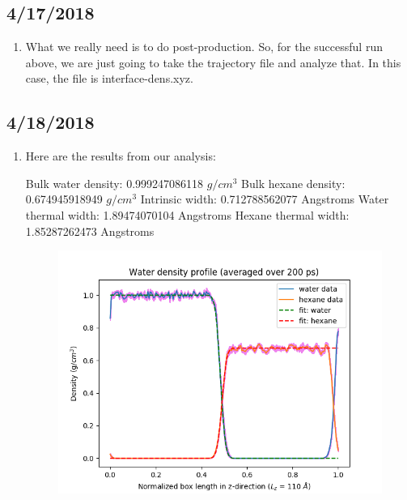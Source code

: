 \documentclass[12pt,reqno]{amsart}
\numberwithin{equation}{section}
\begin{document}
\subsection{4/17/2018}

\begin{enumerate}
\item What we really need is to do post-production.  So, for the successful run above, we are just going to take the trajectory file and analyze that.  In this case, the file is interface-dens.xyz.  
\end{enumerate}

\subsection{4/18/2018}

\begin{enumerate}
\item Here are the results from our analysis: 

\subitem Bulk water density: 0.999247086118 $g/cm^3$
\subitem Bulk hexane density: 0.674945918949 $g/cm^3$
\subitem Intrinsic width: 0.712788562077 Angstroms
\subitem Water thermal width: 1.89474070104 Angstroms
\subitem Hexane thermal width: 1.85287262473 Angstroms

\begin{figure}[H]
\centering
\includegraphics[scale=0.4]{double_profile_with_errors}
\end{figure}


\end{enumerate}
\end{document}
